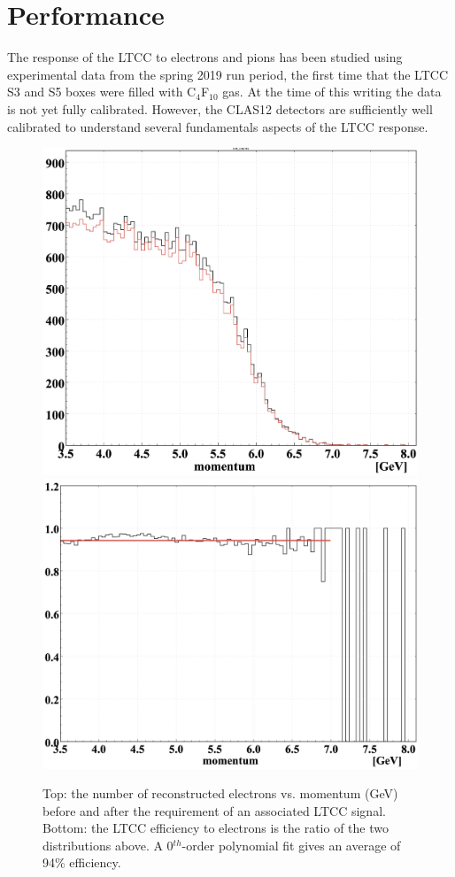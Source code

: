 \section{Performance}

The response of the LTCC to electrons and pions has been studied using experimental data from the spring 2019
run period, the first time that the LTCC S3 and S5 boxes were filled with C$_4$F$_{10}$ gas. At the time of this
writing the data is not yet fully calibrated. However, the CLAS12 detectors are sufficiently well calibrated to
understand several fundamentals aspects of the LTCC response.

\begin{figure}[!ht]
	\centering
	\includegraphics[width=0.9\columnwidth,keepaspectratio]{img/electronMomenta.png}
	\includegraphics[width=0.9\columnwidth,keepaspectratio]{img/electronEfficiency.png}
	\caption{Top: the number of reconstructed electrons vs. momentum (GeV) before and after the requirement of
          an associated LTCC signal. Bottom: the LTCC efficiency to electrons is the ratio of the two distributions above.
          A 0$^{th}$-order polynomial fit gives an average of 94\% efficiency.}
	\label{fig:electronEfficiency}
\end{figure}

